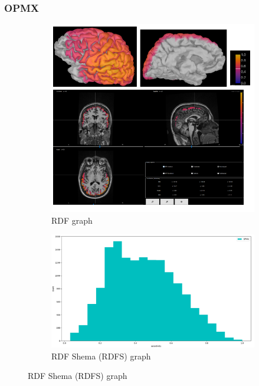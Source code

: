 \documentclass{beamer}
\numberwithin{figure}{section}
\numberwithin{equation}{section}
\begin{document}

\section{}
\begin{frame}
 \frametitle{OPMX}
  

 	\begin{figure}[h]
        \begin{subfigure}[h]{0.53\linewidth} 
            \includegraphics[width=\linewidth]{pictures/OPMX2}
            \caption{\tiny RDF graph}
            \label{fig:rdf_graph}
        \end{subfigure}       
        \begin{subfigure}[h]{0.45\linewidth} 
            \includegraphics[width=\linewidth]{pictures/opmx1}
            \caption{\tiny RDF Shema (RDFS) graph}
            \label{fig:rdfs_graph}
        \end{subfigure}
    \end{figure}

  
\end{frame}
\end{document}
